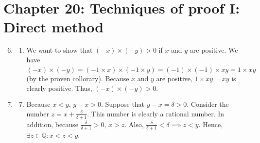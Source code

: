 \documentclass{article}
\begin{document}
\section*{Chapter 20: Techniques of proof I: Direct method}
\begin{enumerate}[label=20.\arabic*]
  \setcounter{enumi}{5}
  \item \begin{enumerate}[label=(\roman*)]
          \item We want to show that $(-x)\times(-y)>0$ if $x$ and $y$ are positive. We have $(-x)
                  \times(-y) = (-1 \times x)\times(-1 \times y) = (-1)\times(-1) \times xy = 1
                  \times xy$ (by the proven collorary). Because $x$ and $y$ are positive, $1 \times
                  xy = xy$ is clearly positive. Thus, $(-x)\times(-y)>0$.
        \end{enumerate}
        \setcounter{enumi}{13}
  \item \begin{enumerate}[label=(\roman*)]
          \setcounter{enumii}{6}
          \item Because $x<y$, $y-x>0$. Suppose that $y-x=\delta>0$. Consider the number $z=x+\frac
                  {\delta}{\delta+1}$. This number is clearly a rational number. In addition,
                because $\frac{\delta}{\delta+1}>0$, $x > z$. Also, $\frac{\delta}{\delta+1}<\delta
                  \implies z < y$. Hence, $\exists z\in\mathbb{Q}: x<z<y$.
        \end{enumerate}
\end{enumerate}
\end{document}
